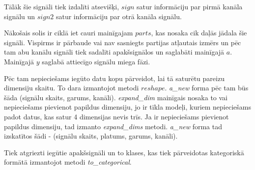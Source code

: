 \documentclass[12pt,paper=A4]{report}
\begin{document}
Tālāk šie signāli tiek izdalīti atsevišķi, $sign$ satur informāciju par pirmā kanāla signālu un $sign2$ satur informāciju par otrā kanāla signālu. 

Nākošais solis ir ciklā iet cauri mainīgajam $parts$, kas nosaka cik daļās jādala šie signāli. Vispirms ir pārbaude vai nav sasniegts partijas atļautais izmērs un pēc tam abu kanālu signāli tiek sadalīti apakšsignālos un saglabāti mainīgajā $a$. Mainīgajā $y$ saglabā attiecīgo signālu miega fāzi. 

Pēc tam nepieciešams iegūto datu kopu pārveidot, lai tā saturētu pareizu dimensiju skaitu. To dara izmantojot metodi $reshape$. \textit{a_new} forma pēc tam būs šāda (signālu skaits, garums, kanāli). \textit{expand_dim} mainīgais nosaka to vai nepieciešams pievienot papildus dimensiju, jo ir tīkla modeļi, kuriem nepieciešams padot datus, kas satur 4 dimensijas nevis trīs. Ja ir nepieciešams pievienot papildus dimensiju, tad izmanto \textit{expand_dims} metodi. \textit{a_new} forma tad izskatītos šādi - (signālu skaits, platums, garums, kanāli). 

Tiek atgriezti iegūtie apakšsignāli un to klases, kas tiek pārveidotas kategoriskā formātā izmantojot metodi \textit{to_categorical}. 

 
\end{document}
